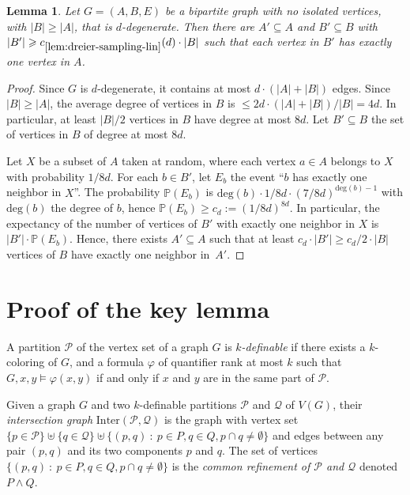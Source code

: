 \documentclass[11pt]{article}
\newtheorem{lemma}{Lemma}
\theoremstyle{definition}
\renewcommand{\le}{\leqslant}
\renewcommand{\ge}{\geqslant}
\renewcommand{\subset}{\subseteq}
\let\phi\varphi
\newcommand{\remph}[1]{{\color{red} \emph{#1}}}
\begin{document}
\begin{lemma}\label{lem:dreier-sampling-lin}
Let $G = (A, B, E)$ be a bipartite graph with no isolated vertices, with $|B| \ge |A|$, that is $d$-degenerate.
Then there are $A' \subseteq A$ and $B' \subseteq B$ with $|B'| \ge c_{\ref{lem:dreier-sampling-lin}}(d) \cdot |B|$ such that each vertex in $B'$ has exactly one vertex in $A$.
\end{lemma}
\begin{proof}
Since $G$ is $d$-degenerate, it contains at most $d \cdot (|A| + |B|)$ edges. 
Since $|B| \ge |A|$, the average degree of vertices in $B$ is $\le 2 d \cdot (|A| + |B|) / |B| = 4d$.
In particular, at least $|B|/2$ vertices in $B$ have degree at most $8d$.
Let $B' \subset B$ the set of vertices in $B$ of degree at most $8d$.

Let $X$ be a subset of $A$ taken at random, where each vertex $a \in A$ belongs to $X$ with probability $1/8d$.
For each $b \in B'$, let $E_b$ the event ``$b$ has exactly one neighbor in $X$''.
The probability $\mathbb{P}(E_b)$ is $\text{deg}(b) \cdot 1/8d \cdot (7/8d)^{\text{deg}(b) - 1}$ with $\text{deg}(b)$ the degree of $b$, hence $\mathbb{P}(E_b) \ge c_d := (1/8d)^{8d}$.
In particular, the expectancy of the number of vertices of $B'$ with exactly one neighbor in $X$ is $|B'| \cdot \mathbb{P}(E_b)$.
Hence, there exists $A' \subset A$ such that at least $c_d \cdot |B'| \ge c_d/2 \cdot |B|$ vertices of $B$ have exactly one neighbor in~$A'$.

\end{proof}
\section{Proof of the key lemma}


A partition $\mathcal P$ of the vertex set of a graph $G$ is \remph{$k$-definable} if there exists a $k$-coloring of $G$, and a formula $\phi$ of quantifier rank at most $k$ such that $G, x, y \models \phi(x, y)$ if and only if $x$ and $y$ are in the same part of $\mathcal P$.

Given a graph $G$ and two $k$-definable partitions $\mathcal P$ and $\mathcal Q$ of $V(G)$, their \remph{intersection graph} $\text{Inter}(\mathcal P, \mathcal Q)$ is the graph with vertex set $\{p \in \mathcal P\} \uplus \{q \in \mathcal Q\} \uplus \{(p,q) ~:~ p \in P, q \in Q, p \cap q \neq \emptyset\}$ and edges between any pair $(p, q)$ and its two components $p$ and $q$.
The set of vertices $\{(p,q) ~:~ p \in P, q \in Q, p \cap q \neq \emptyset\}$ is the \emph{common refinement of $\mathcal P$ and $\mathcal Q$} denoted $P \wedge Q$.
\end{document}
